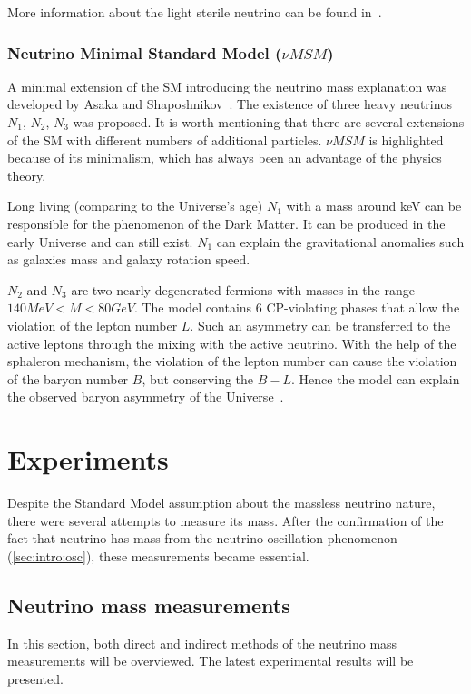 \documentclass[../main.tex]{subfiles}
\begin{document}
More information about the light sterile neutrino can be found in~\cite{Abazajian2012}.

\subsubsection{Neutrino Minimal Standard Model ($\nu MSM$)}
\label{sec:intro:numsm}
A minimal extension of the SM introducing the neutrino mass explanation was developed by Asaka and Shaposhnikov~\cite{Asaka2005}. The existence of three heavy neutrinos $N_1$, $N_2$, $N_3$ was proposed. It is worth mentioning that there are several extensions of the SM with different numbers of additional particles. $\nu MSM$ is highlighted because of its minimalism, which has always been an advantage of the physics theory.

Long living (comparing to the Universe's age) $N_1$ with a mass around keV can be responsible for the phenomenon of the Dark Matter. It can be produced in the early Universe and can still exist. $N_1$ can explain the gravitational anomalies such as galaxies mass and galaxy rotation speed.

$N_2$ and $N_3$ are two nearly degenerated fermions with masses in the range $140 MeV < M < 80 GeV$. The model contains 6 CP-violating phases that allow the violation of the lepton number $L$. Such an asymmetry can be transferred to the active leptons through the mixing with the active neutrino. With the help of the sphaleron mechanism, the violation of the lepton number can cause the violation of the baryon number $B$, but conserving the $B-L$. Hence the model can explain the observed baryon asymmetry of the Universe~\cite{Asaka2005a}.

\section{Experiments}
Despite the Standard Model assumption about the massless neutrino nature, there were several attempts to measure its mass. After the confirmation of the fact that neutrino has mass from the neutrino oscillation phenomenon (\autoref{sec:intro:osc}), these measurements became essential.

\subsection{Neutrino mass measurements}
In this section, both direct and indirect methods of the neutrino mass measurements will be overviewed. The latest experimental results will be presented.
\end{document}
